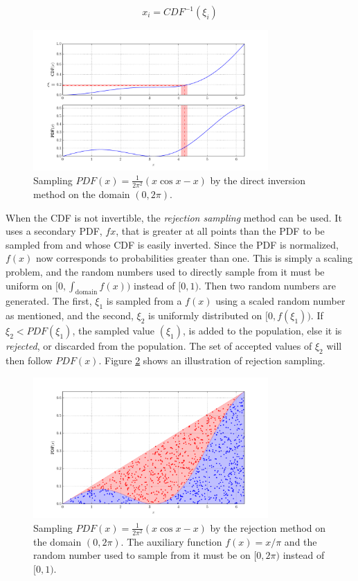 \begin{equation}
\label{CDF_inversion}
 x_i = CDF^{-1}(\xi_i)
\end{equation}

\begin{figure}[h!] 
  \label{direct_samp}
  \centering
    \includegraphics[width=0.8\textwidth]{graphics/direct_samp.pdf}
     \caption{Sampling $PDF(x)=\frac{1}{2\pi^2}(x \cos x - x)$ by the direct inversion method on the domain $(0,2\pi)$.}
\end{figure}

When the CDF is not invertible, the \emph{rejection sampling} method can be used.  It uses a secondary PDF, $f{x}$, that is greater at all points than the PDF to be sampled from and whose CDF is easily inverted.  Since the PDF is normalized, $f(x)$ now corresponds to probabilities greater than one.  This is simply a scaling problem, and the random numbers used to directly sample from it must be uniform on $[0,\int_\mathrm{domain}f(x))$ instead of $[0,1)$.   Then two random numbers are generated.  The first, $\xi_1$ is sampled from a $f(x)$ using a scaled random number as mentioned, and the second, $\xi_2$ is uniformly distributed on $[0,f(\xi_1))$.  If $\xi_2 < PDF(\xi_1)$, the sampled value $(\xi_1)$, is added to the population, else it is \emph{rejected}, or discarded from the population.  The set of accepted values of ${\xi_2}$ will then follow $PDF(x)$.  Figure \ref{rejection_samp} shows an illustration of rejection sampling.

\begin{figure}[h!] 
  \label{rejection_samp}
  \centering
    \includegraphics[width=0.8\textwidth]{graphics/rejection_samp.pdf}
     \caption{Sampling $PDF(x)=\frac{1}{2\pi^2}(x \cos x - x)$ by the rejection method on the domain $(0,2\pi)$.  The auxiliary function $f(x)=x/\pi$ and the random number used to sample from it must be on $[0,2\pi)$ instead of $[0,1)$.}
\end{figure}

